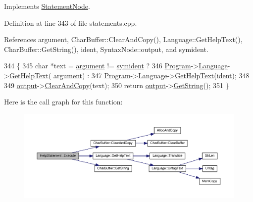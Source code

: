 Implements \hyperlink{classStatementNode_a721589622c930c010927b9a9c55b173e}{Statement\+Node}.



Definition at line 343 of file statements.\+cpp.



References argument, Char\+Buffer\+::\+Clear\+And\+Copy(), Language\+::\+Get\+Help\+Text(), Char\+Buffer\+::\+Get\+String(), ident, Syntax\+Node\+::output, and symident.


\begin{DoxyCode}
344 \{
345     \textcolor{keywordtype}{char} *text = \hyperlink{classHelpStatement_abef33224fd4d73c2501217dba61dd395}{argument} != \hyperlink{lex_8h_a7feef761cd73fac6e25b8bb80d2c4e54ade7694e5efc9616383548e57122faea5}{symident} ?
346                  \hyperlink{classProgram}{Program}->\hyperlink{classProgram_a7c82b4c429bbee984b8bb287b9e137f7}{Language}->\hyperlink{classLanguage_a0044feceac32f8ce943b88165ade965e}{GetHelpText}(
      \hyperlink{classHelpStatement_abef33224fd4d73c2501217dba61dd395}{argument}) :
347                  \hyperlink{classProgram}{Program}->\hyperlink{classProgram_a7c82b4c429bbee984b8bb287b9e137f7}{Language}->\hyperlink{classLanguage_a0044feceac32f8ce943b88165ade965e}{GetHelpText}(\hyperlink{classHelpStatement_a464f49dcbd47d1050df5b822aaffc839}{ident});
348 
349     \hyperlink{classSyntaxNode_a1180628cbe3fce43930cee0df5a9ce5c}{output}->\hyperlink{classCharBuffer_ac52ed7b91190240eb7db4cf43d1e2abb}{ClearAndCopy}(text);
350     \textcolor{keywordflow}{return} \hyperlink{classSyntaxNode_a1180628cbe3fce43930cee0df5a9ce5c}{output}->\hyperlink{classCharBuffer_a7dfd3feaaf80f318ba44efe15b1ec44b}{GetString}();
351 \}
\end{DoxyCode}


Here is the call graph for this function\+:\nopagebreak
\begin{figure}[H]
\begin{center}
\leavevmode
\includegraphics[width=350pt]{classHelpStatement_a733d3471c3bcfdd2d07d4766bbdbf6db_cgraph}
\end{center}
\end{figure}




